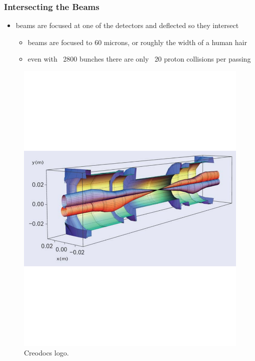 \documentclass[
	11pt, %
]{beamer}
\begin{document}
\begin{frame}
\frametitle{Intersecting the Beams}
	\begin{itemize}
		\item beams are focused at one of the detectors and deflected so they intersect
			\begin{itemize}
				\item beams are focused to 60 microns, or roughly the width of a human hair
				\item even with ~2800 bunches there are only ~20 proton collisions per passing
			\end{itemize}
	\end{itemize}

\begin{figure}
	\vspace*{-2cm}
	 \hspace*{0cm}
	\includegraphics[scale=.3]{beams.pdf}
	\caption{Creodocs logo.}
\end{figure}
\end{frame}
\end{document}
